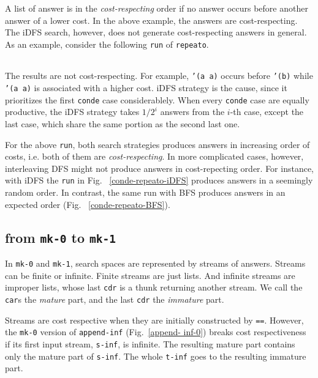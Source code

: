 \documentclass[format=acmlarge, review=true, authordraft=true]{acmart}
\begin{document}
A list of answer is in the \emph{cost-respecting} order if no answer occurs
before another answer of a lower cost. In the above example, the answers are
cost-respecting. The iDFS search, however, does not generate cost-respecting
answers in general. As an example, consider the following \texttt{run} of
\texttt{repeato}.
\begin{center}
  \begin{tabular}{c}
   
   \end{tabular}
\end{center}

The results are not cost-respecting. For example, \texttt{'(a a)} occurs before
\texttt{'(b)} while \texttt{'(a a)} is associated with a higher cost. 
iDFS strategy is the cause, since it prioritizes the first \texttt{conde} case
considerablely. When every \texttt{conde} case are equally productive, the iDFS
strategy takes $1/2^{i}$ answers from the $i$-th case, except the last case,
which share the same portion as the second last one.


For the above \texttt{run}, both search strategies produces answers in 
increasing order of costs, i.e. both of them are \emph{cost-respecting}. In 
more complicated cases, however, interleaving DFS might not produce answers in 
cost-repecting order. For instance, with iDFS the \texttt{run} in Fig.~
\ref{conde-repeato-iDFS} produces answers in a seemingly random order. In 
contrast, the same run with BFS produces answers in an expected order (Fig.~
\ref{conde-repeato-BFS}).



\subsection{from \texttt{mk-0} to \texttt{mk-1}}

In \texttt{mk-0} and \texttt{mk-1}, search spaces are represented by streams of 
answers. Streams can be finite or infinite. Finite streams are just lists. And 
infinite streams are improper lists, whose last \texttt{cdr} is a thunk 
returning another stream. We call the \texttt{car}s the \emph{mature} part, and 
the last \texttt{cdr} the \emph{immature} part. 

Streams are cost respective when they are initially constructed by \texttt{==}. 
However, the \texttt{mk-0} version of \texttt{append-inf} (Fig.~\ref{append-
inf-0}) breaks cost respectiveness if its first input stream, \texttt{s-inf}, 
is infinite. The resulting mature part contains only the mature part of 
\texttt{s-inf}. The whole \texttt{t-inf} goes to the resulting immature part.
\end{document}

